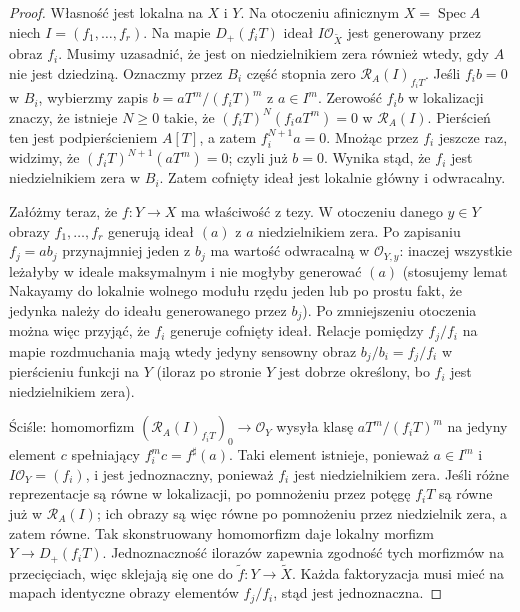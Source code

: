 \documentclass[11pt,a4paper,openany]{report}
\numberwithin{equation}{section}
\theoremstyle{plain}
\theoremstyle{definition}
\theoremstyle{remark}
\newcommand{\Spec}{\operatorname{Spec}}
\begin{document}
\begin{proof}
Własność jest lokalna na $X$ i $Y$. Na otoczeniu
afinicznym $X=\Spec A$ niech $I=(f_1,\ldots,f_r)$.
Na mapie $D_+(f_iT)$ ideał $I\mathcal O_{\widetilde X}$
jest generowany przez obraz $f_i$. Musimy uzasadnić,
że jest on niedzielnikiem zera również wtedy, gdy $A$
nie jest dziedziną. Oznaczmy przez $B_i$ część stopnia
zero $\mathcal R_A(I)_{f_iT}$. Jeśli $f_i b=0$ w $B_i$,
wybierzmy zapis $b=aT^m/(f_iT)^m$ z $a\in I^m$.
Zerowość $f_i b$ w lokalizacji znaczy, że istnieje
$N\ge0$ takie, że $(f_iT)^N(f_i aT^m)=0$
w $\mathcal R_A(I)$. Pierścień ten jest podpierścieniem
$A[T]$, a zatem $f_i^{N+1}a=0$. Mnożąc przez $f_i$
jeszcze raz, widzimy, że $(f_iT)^{N+1}(aT^m)=0$;
czyli już $b=0$. Wynika stąd, że $f_i$ jest
niedzielnikiem zera w $B_i$. Zatem cofnięty ideał
jest lokalnie główny i odwracalny.

Załóżmy teraz, że $f:Y\to X$ ma właściwość z tezy.
W otoczeniu danego $y\in Y$ obrazy $f_1,\ldots,f_r$
generują ideał $(a)$ z $a$ niedzielnikiem zera.
Po zapisaniu $f_j=ab_j$ przynajmniej jeden z $b_j$
ma wartość odwracalną w $\mathcal O_{Y,y}$: inaczej
wszystkie leżałyby w ideale maksymalnym i nie mogłyby
generować $(a)$ (stosujemy lemat Nakayamy do lokalnie
wolnego modułu rzędu jeden lub po prostu fakt, że
jedynka należy do ideału generowanego przez $b_j$).
Po zmniejszeniu otoczenia można więc przyjąć, że
$f_i$ generuje cofnięty ideał. Relacje pomiędzy
$f_j/f_i$ na mapie rozdmuchania mają wtedy jedyny
sensowny obraz $b_j/b_i=f_j/f_i$ w pierścieniu
funkcji na $Y$ (iloraz po stronie $Y$ jest dobrze
określony, bo $f_i$ jest niedzielnikiem zera).

Ściśle: homomorfizm
$(\mathcal R_A(I)_{f_iT})_0\to\mathcal O_Y$
wysyła klasę $aT^m/(f_iT)^m$ na jedyny element
$c$ spełniający $f_i^m c=f^\sharp(a)$.
Taki element istnieje, ponieważ $a\in I^m$ i
$I\mathcal O_Y=(f_i)$, i jest jednoznaczny,
ponieważ $f_i$ jest niedzielnikiem zera.
Jeśli różne reprezentacje są równe w lokalizacji,
po pomnożeniu przez potęgę $f_iT$ są równe już w
$\mathcal R_A(I)$; ich obrazy są więc równe po
pomnożeniu przez niedzielnik zera, a zatem równe.
Tak skonstruowany homomorfizm daje lokalny morfizm
$Y\to D_+(f_iT)$. Jednoznaczność ilorazów zapewnia
zgodność tych morfizmów na przecięciach, więc
sklejają się one do $\widetilde f:Y\to\widetilde X$.
Każda faktoryzacja musi mieć na mapach identyczne
obrazy elementów $f_j/f_i$, stąd jest jednoznaczna.
\end{proof}
\end{document}
